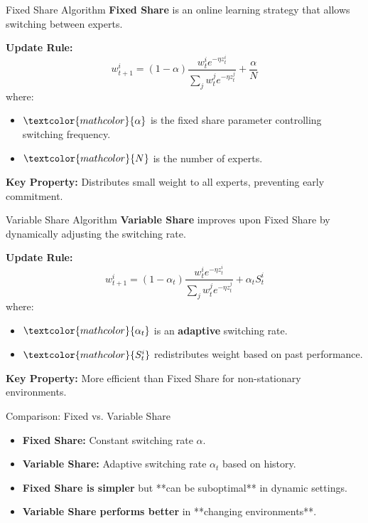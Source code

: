 \documentclass[handout]{beamer}
\begin{document}
\begin{frame}{Fixed Share Algorithm}
\textbf{Fixed Share} is an online learning strategy that allows switching between experts.

\textbf{Update Rule:} 
\[
w_{t+1}^i = (1 - \alpha) \frac{w_t^i e^{-\eta z_t^i}}{\sum_j w_t^j e^{-\eta z_t^j}} + \frac{\alpha}{N}
\]
where:
\begin{itemize}
    \item \( \textcolor{mathcolor}{\alpha} \) is the fixed share parameter controlling switching frequency.
    \item \( \textcolor{mathcolor}{N} \) is the number of experts.
\end{itemize}

\textbf{Key Property:} \textcolor{mathcolor}{Distributes small weight to all experts, preventing early commitment}.
\end{frame}

\begin{frame}{Variable Share Algorithm}
\textbf{Variable Share} improves upon Fixed Share by dynamically adjusting the switching rate.

\textbf{Update Rule:} 
\[
w_{t+1}^i = (1 - \alpha_t) \frac{w_t^i e^{-\eta z_t^i}}{\sum_j w_t^j e^{-\eta z_t^j}} + \alpha_t S_t^i
\]
where:
\begin{itemize}
    \item \( \textcolor{mathcolor}{\alpha_t} \) is an \textbf{adaptive} switching rate.
    \item \( \textcolor{mathcolor}{S_t^i} \) redistributes weight based on past performance.
\end{itemize}

\textbf{Key Property:} \textcolor{mathcolor}{More efficient than Fixed Share for non-stationary environments}.
\end{frame}

\begin{frame}{Comparison: Fixed vs. Variable Share}
\begin{itemize}
    \item \textbf{Fixed Share:} \textcolor{mathcolor}{Constant switching rate} \( \alpha \).
    \item \textbf{Variable Share:} \textcolor{mathcolor}{Adaptive switching rate} \( \alpha_t \) based on history.
    \item \textbf{Fixed Share is simpler} but **can be suboptimal** in dynamic settings.
    \item \textbf{Variable Share performs better} in **changing environments**.
\end{itemize}
\end{frame}
\end{document}
